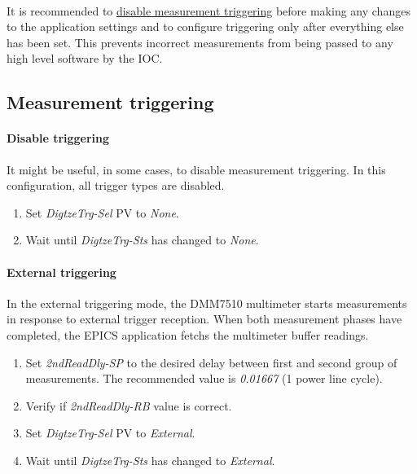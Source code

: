 \documentclass[openany]{article}
\begin{document}
	\paragraph{} It is recommended to \hyperref[disable-triggering]{disable measurement triggering} before making any changes to the application settings and to configure triggering only after everything else has been set. This prevents incorrect measurements from being passed to any high level software by the IOC.

	\subsection{Measurement triggering}

		\paragraph{Disable triggering}\label{disable-triggering} It might be useful, in some cases, to disable measurement triggering. In this configuration, all trigger types are disabled.

			\begin{enumerate}
				\item Set \emph{DigtzeTrg-Sel} PV to \emph{None}.
				\item Wait until \emph{DigtzeTrg-Sts} has changed to \emph{None}.
			\end{enumerate}

		\paragraph{External triggering} In the external triggering mode, the DMM7510 multimeter starts measurements in response to external trigger reception. When both measurement phases have completed, the EPICS application fetchs the multimeter buffer readings.

			\begin{enumerate}
				\item Set \emph{2ndReadDly-SP} to the desired delay between first and second group of measurements. The recommended value is \emph{0.01667} (1 power line cycle).
				\item Verify if \emph{2ndReadDly-RB} value is correct.
				\item Set \emph{DigtzeTrg-Sel} PV to \emph{External}.
				\item Wait until \emph{DigtzeTrg-Sts} has changed to \emph{External}.
			\end{enumerate}
\end{document}
